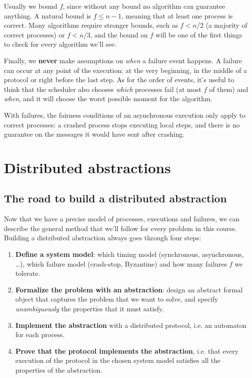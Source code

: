 Usually we bound $f$, since without any bound no algorithm can guarantee anything. A natural bound is $f \leq n-1$, meaning that at least one process is correct. Many algorithms require stronger bounds, such as $f < n/2$ (a majority of correct processes) or $f < n/3$, and the bound on $f$ will be one of the first things to check for every algorithm we'll see.

Finally, we \textbf{never} make assumptions on \textit{when} a failure event happens. A failure can occur at any point of the execution: at the very beginning, in the middle of a protocol or right before the last step. As for the order of events, it's useful to think that the scheduler also chooses \textit{which} processes fail (at most $f$ of them) and \textit{when}, and it will choose the worst possible moment for the algorithm.

\begin{framedobs}{}
  With failures, the fairness conditions of an asynchronous execution only apply to correct processes: a crashed process stops executing local steps, and there is no guarantee on the messages it would have sent after crashing.
\end{framedobs}

\section{Distributed abstractions}

\subsection{The road to build a distributed abstraction}\label{sec:road}

Now that we have a precise model of processes, executions and failures, we can describe the general method that we'll follow for every problem in this course. Building a distributed abstraction always goes through four steps:
\begin{enumerate}
  \item \textbf{Define a system model}: which timing model (synchronous, asynchronous, \ldots), which failure model (crash-stop, Byzantine) and how many failures $f$ we tolerate.
  \item \textbf{Formalize the problem with an abstraction}: design an abstract formal object that captures the problem that we want to solve, and specify \textit{unambiguously} the properties that it must satisfy.
  \item \textbf{Implement the abstraction} with a distributed protocol, i.e. an automaton for each process.
  \item \textbf{Prove that the protocol implements the abstraction}, i.e. that every execution of the protocol in the chosen system model satisfies all the properties of the abstraction.
\end{enumerate}

